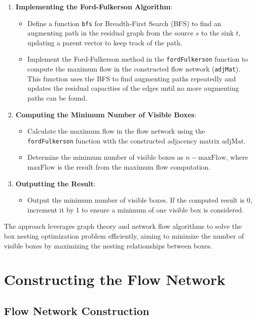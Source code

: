 \documentclass{article}
\begin{document}
\begin{enumerate}
    \item \textbf{Implementing the Ford-Fulkerson Algorithm}:
    \begin{itemize}
        \item Define a function \texttt{bfs} for Breadth-First Search (BFS) to find an augmenting path in the residual graph from the source \( s \) to the sink \( t \), updating a parent vector to keep track of the path.
        \item Implement the Ford-Fulkerson method in the \texttt{fordFulkerson} function to compute the maximum flow in the constructed flow network (\texttt{adjMat}). This function uses the BFS to find augmenting paths repeatedly and updates the residual capacities of the edges until no more augmenting paths can be found.
    \end{itemize}
    
    \item \textbf{Computing the Minimum Number of Visible Boxes}:
    \begin{itemize}
        \item Calculate the maximum flow in the flow network using the \texttt{fordFulkerson} function with the constructed adjacency matrix \( \text{adjMat} \).
        \item Determine the minimum number of visible boxes as \( n - \text{maxFlow} \), where \( \text{maxFlow} \) is the result from the maximum flow computation.
    \end{itemize}
    
    \item \textbf{Outputting the Result}:
    \begin{itemize}
        \item Output the minimum number of visible boxes. If the computed result is 0, increment it by 1 to ensure a minimum of one visible box is considered.
    \end{itemize}
\end{enumerate}

The approach leverages graph theory and network flow algorithms to solve the box nesting optimization problem efficiently, aiming to minimize the number of visible boxes by maximizing the nesting relationships between boxes.


\section*{Constructing the Flow Network}


\subsection*{Flow Network Construction}
\end{document}
